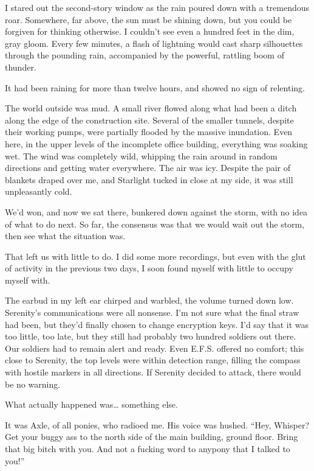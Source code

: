 I stared out the second-story window as the rain poured down with a tremendous roar. Somewhere, far above, the sun must be shining down, but you could be forgiven for thinking otherwise. I couldn’t see even a hundred feet in the dim, gray gloom. Every few minutes, a flash of lightning would cast sharp silhouettes through the pounding rain, accompanied by the powerful, rattling boom of thunder.

It had been raining for more than twelve hours, and showed no sign of relenting.

The world outside was mud. A small river flowed along what had been a ditch along the edge of the construction site. Several of the smaller tunnels, despite their working pumps, were partially flooded by the massive inundation. Even here, in the upper levels of the incomplete office building, everything was soaking wet. The wind was completely wild, whipping the rain around in random directions and getting water everywhere. The air was icy. Despite the pair of blankets draped over me, and Starlight tucked in close at my side, it was still unpleasantly cold.

We’d won, and now we sat there, bunkered down against the storm, with no idea of what to do next. So far, the consensus was that we would wait out the storm, then see what the situation was.

That left us with little to do. I did some more recordings, but even with the glut of activity in the previous two days, I soon found myself with little to occupy myself with.

The earbud in my left ear chirped and warbled, the volume turned down low. Serenity’s communications were all nonsense. I’m not sure what the final straw had been, but they’d finally chosen to change encryption keys. I’d say that it was too little, too late, but they still had probably two hundred soldiers out there. Our soldiers had to remain alert and ready. Even E.F.S. offered no comfort; this close to Serenity, the top levels were within detection range, filling the compass with hostile markers in all directions. If Serenity decided to attack, there would be no warning.

What actually happened was… something else.

It was Axle, of all ponies, who radioed me. His voice was hushed. “Hey, Whisper? Get your buggy ass to the north side of the main building, ground floor. Bring that big bitch with you. And not a fucking word to anypony that I talked to you!”

